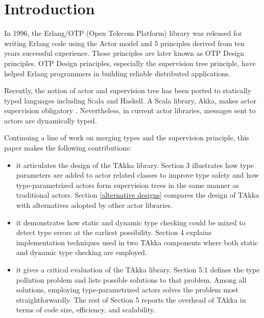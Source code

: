 \section{Introduction}

In 1996, the Erlang/OTP (Open Telecom Platform) library\cite{ErlangWeb} was
released for writing Erlang code using the Actor model\cite{Hewitt:1973} and 5
principles derived from ten years successful experience.  Those principles are
later known as OTP Design principles. OTP Design principles, especially the
supervision tree principle, have helped Erlang programmers in building reliable
distributed applications\cite{ArmstrongErlang}.

Recently, the notion of actor and supervision tree has been ported to
statically typed languages including Scala and Haskell.  A Scala library, Akka,
makes actor supervision obligatory \cite{akka_api,akka_doc}. Nevertheless, in
current actor libraries, messages sent to actors are dynamically typed.

Continuing a line of work on merging types and the supervision principle, this
paper makes the following contributions:
\begin{itemize}
 \item it articulates the design of the TAkka library.  Section 3 illustrates
how type parameters are added to actor related classes to improve type safety
and how type-parametrized actors form supervision trees in the same manner as
traditional actors. Section \ref{alternative designs} compares the design of
TAkka with alternatives adopted by other actor libraries.
 \item it demonstrates how static and dynamic type checking could be mixed to
detect type errors at the earliest possibility.  Section 4 explains
implementation techniques used in two TAkka components where both static and
dynamic type checking are employed.
 \item it gives a critical evaluation of the TAkka library.  Section 5.1
defines the type pollution problem and lists possible solutions to that problem.
Among all solutions, employing type-parametrized actors solves the problem
most straightforwardly. The rest of Section 5 reports the overhead of TAkka in
terms of code size, efficiency, and scalability.
\end{itemize}

